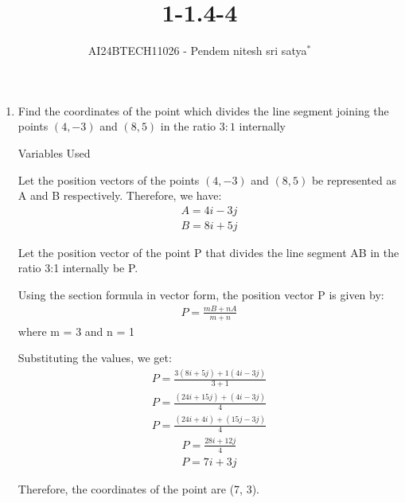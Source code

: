 \documentclass[journal]{IEEEtran}
\begin{document}

\vspace{3cm}


\title{1-1.4-4}
\author{AI24BTECH11026 - Pendem nitesh sri satya$^{*}$%
}
\maketitle
\begin{enumerate}
    \item Find the coordinates of the point which divides the line segment joining the points $(4,-3)$ and $(8,5)$ in the ratio $3:1$ internally\\
\solution

\begin{table}[h!]    
  \centering
  
  \caption{Variables Used}
  \label{tab10.5.3.9.1}
\end{table}
Let the position vectors of the points \((4, -3)\) and \((8, 5)\) be represented as A and B respectively. Therefore, we have:
\begin{align}
A = 4i - 3j
\end{align}
\begin{align}
B = 8i + 5j
\end{align}

Let the position vector of the point P that divides the line segment AB in the ratio 3:1 internally be P.

Using the section formula in vector form, the position vector P is given by:
\begin{align}
P = \frac{m{B} + n{A}}{m+n}
\end{align}
where m = 3 and n = 1

Substituting the values, we get:
\begin{align}
P = \frac{3(8i + 5j) + 1(4i - 3j)}{3+1}
\end{align}
\begin{align}
P = \frac{(24i + 15j) + (4i - 3j)}{4}
\end{align}
\begin{align}
P = \frac{(24i + 4i) + (15j - 3j)}{4}
\end{align}
\begin{align}
P = \frac{28i + 12j}{4}
\end{align}
\begin{align}
P = 7i + 3j
\end{align}

Therefore, the coordinates of the point are (7, 3).
\end{enumerate}
\end{document}
